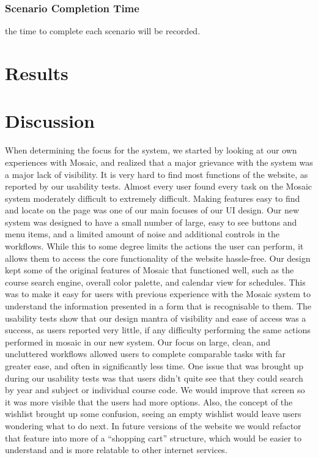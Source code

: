 \documentclass[10pt]{article}
\begin{document}
\begin{multicols}{2}
\subsubsection*{Scenario Completion Time}
the time to complete each scenario  will be recorded.\\


\section*{Results}
\section*{Discussion}
When determining the focus for the system, we started by looking at our own experiences with Mosaic, and realized that a major grievance with the system was a major lack of visibility. It is very hard to find most functions of the website, as reported by our usability tests. Almost every user found every task on the Mosaic system moderately difficult to extremely difficult. Making features easy to find and locate on the page was one of our main focuses of our UI design. Our new system was designed to have a small number of large, easy to see buttons and menu items, and a limited amount of noise and additional controls in the workflows. While this to some degree limits the actions the user can perform, it allows them to access the core functionality of the website hassle-free. Our design kept some of the original features of Mosaic that functioned well, such as the course search engine, overall color palette, and calendar view for schedules. This was to make it easy for users with previous experience with the Mosaic system to understand the information presented in a form that is recognisable to them. The usability tests show that our design mantra of visibility and ease of access was a success, as users reported very little, if any difficulty performing the same actions performed in mosaic in our new system. Our focus on large, clean, and uncluttered workflows allowed users to complete comparable tasks with far greater ease, and often in significantly less time. One issue that was brought up during our usability tests was that users didn’t quite see that they could search by year and subject or individual course code. We would improve that screen so it was more visible that the users had more options. Also, the concept of the wishlist brought up some confusion, seeing an empty wishlist would leave users wondering what to do next. In future versions of the website we would refactor that feature into more of a “shopping cart” structure, which would be easier to understand and is more relatable to other internet services.

\end{multicols}
\end{document}

